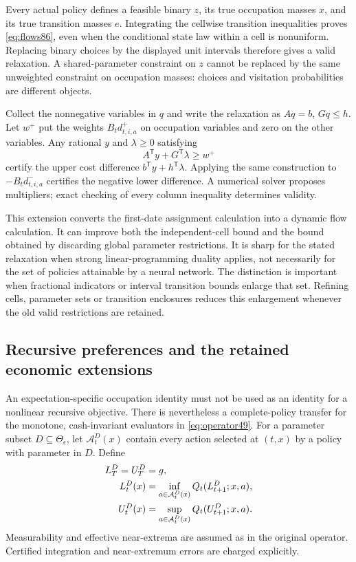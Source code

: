 Every actual policy defines a feasible binary $z$, its true occupation masses $x$, and its true transition masses $e$. Integrating the cellwise transition inequalities proves \eqref{eq:flows86}, even when the conditional state law within a cell is nonuniform. Replacing binary choices by the displayed unit intervals therefore gives a valid relaxation. A shared-parameter constraint on $z$ cannot be replaced by the same unweighted constraint on occupation masses: choices and visitation probabilities are different objects.

\begin{corollary}\label{cor:flow-dual86}
Collect the nonnegative variables in $q$ and write the relaxation as $Aq=b$, $Gq\le h$. Let $w^+$ put the weights $B_td_{t,i,a}^+$ on occupation variables and zero on the other variables. Any rational $y$ and $\lambda\ge0$ satisfying
\[
 A^{\mathsf T}y+G^{\mathsf T}\lambda\ge w^+
\]
certify the upper cost difference $b^{\mathsf T}y+h^{\mathsf T}\lambda$. Applying the same construction to $-B_td_{t,i,a}^-$ certifies the negative lower difference. A numerical solver proposes multipliers; exact checking of every column inequality determines validity.
\end{corollary}

This extension converts the first-date assignment calculation into a dynamic flow calculation. It can improve both the independent-cell bound and the bound obtained by discarding global parameter restrictions. It is sharp for the stated relaxation when strong linear-programming duality applies, not necessarily for the set of policies attainable by a neural network. The distinction is important when fractional indicators or interval transition bounds enlarge that set. Refining cells, parameter sets or transition enclosures reduces this enlargement whenever the old valid restrictions are retained.

\subsection{Recursive preferences and the retained economic extensions}
An expectation-specific occupation identity must not be used as an identity for a nonlinear recursive objective. There is nevertheless a complete-policy transfer for the monotone, cash-invariant evaluators in \eqref{eq:operator49}. For a parameter subset $D\subseteq\Theta_\epsilon$, let $\mathcal A_t^D(x)$ contain every action selected at $(t,x)$ by a policy with parameter in $D$. Define
\begin{align}\label{eq:nonlinear86}
 L_T^D=U_T^D&=g,\\
 L_t^D(x)&=\inf_{a\in\mathcal A_t^D(x)}Q_t(L_{t+1}^D;x,a),\\
 U_t^D(x)&=\sup_{a\in\mathcal A_t^D(x)}Q_t(U_{t+1}^D;x,a).\notag
\end{align}
Measurability and effective near-extrema are assumed as in the original operator. Certified integration and near-extremum errors are charged explicitly.

